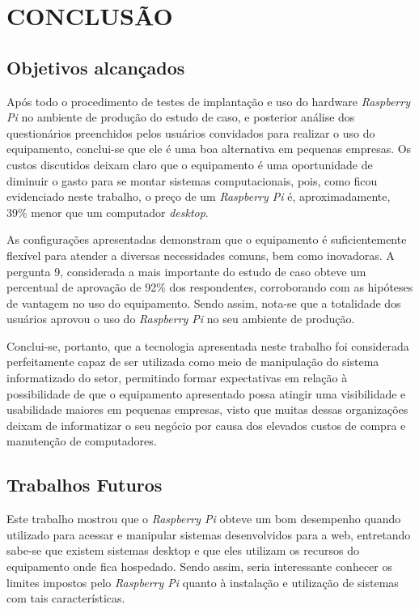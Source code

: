 \chapter{CONCLUSÃO}

\section{Objetivos alcançados}

Após todo o procedimento de testes de implantação e uso do hardware \textit{Raspberry Pi} no ambiente de produção do estudo de caso, e posterior análise dos questionários preenchidos pelos usuários convidados para realizar o uso do equipamento, conclui-se que ele é uma boa alternativa em pequenas empresas.
Os custos discutidos deixam claro que o equipamento é uma oportunidade de diminuir o gasto para se montar sistemas computacionais, pois, como ficou evidenciado neste trabalho, o preço de um \textit{Raspberry Pi} é, aproximadamente, 39\% menor que um computador \textit{desktop}.

As configurações apresentadas demonstram que o equipamento é suficientemente flexível para atender a diversas necessidades comuns, bem como inovadoras.
A pergunta 9, considerada a mais importante do estudo de caso obteve um percentual de aprovação de 92\% dos respondentes, corroborando com as hipóteses de vantagem no uso do equipamento. Sendo assim, nota-se que a totalidade dos usuários aprovou o uso do \textit{Raspberry Pi} no seu ambiente de produção.

Conclui-se, portanto, que a tecnologia apresentada neste trabalho foi considerada perfeitamente capaz de ser utilizada como meio de manipulação do sistema informatizado do setor, permitindo formar expectativas em relação à possibilidade de que o equipamento apresentado possa atingir uma visibilidade e usabilidade maiores em pequenas empresas, visto que muitas dessas organizações deixam de informatizar o seu negócio por causa dos elevados custos de compra e manutenção de computadores.

\section{Trabalhos Futuros}

Este trabalho mostrou que o \textit{Raspberry Pi} obteve um bom desempenho quando utilizado para acessar e manipular sistemas desenvolvidos para a web, entretando sabe-se que existem sistemas desktop e que eles utilizam os recursos do equipamento onde fica hospedado. Sendo assim, seria interessante conhecer os limites impostos pelo \textit{Raspberry Pi} quanto à instalação e utilização de sistemas com tais características.